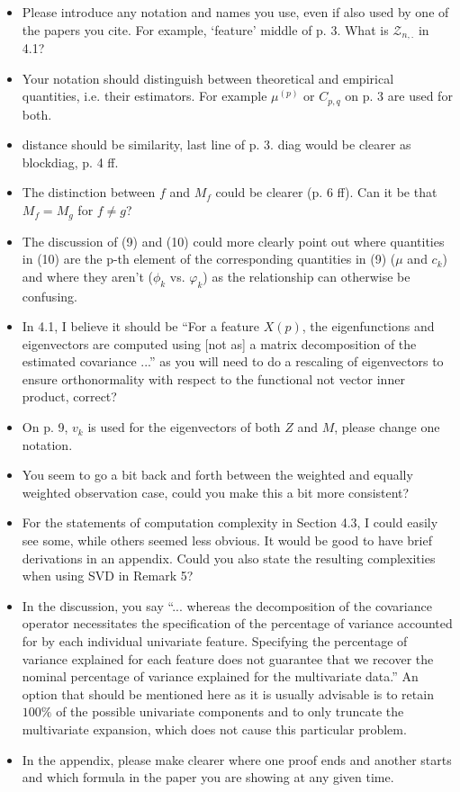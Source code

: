 \documentclass[11pt]{article}
\begin{document}
\begin{itemize}
  \item  Please introduce any notation and names you use, even if also used by one of the papers you cite. For example, ‘feature’ middle of p. 3. What is $\mathcal{Z}_{n,.}$ in 4.1?
  \item Your notation should distinguish between theoretical and empirical quantities, i.e. their estimators. For example $\mu^{(p)}$ or $C_{p,q}$ on p. 3 are used for both.
  \item distance should be similarity, last line of p. 3. diag would be clearer as blockdiag, p. 4 ff.
  \item The distinction between $f$ and $M_f$ could be clearer (p. 6 ff). Can it be that $M_f = M_g$ for $f \neq g$?
  \item The discussion of (9) and (10) could more clearly point out where quantities in (10) are the p-th element of the corresponding quantities in (9) ($\mu$ and $c_k$) and where they aren't ($\phi_k$ vs. $\varphi_k$) as the relationship can otherwise be confusing.
  \item In 4.1, I believe it should be “For a feature $X(p)$, the eigenfunctions and eigenvectors are computed using [not as] a matrix decomposition of the estimated covariance ...” as you will need to do a rescaling of eigenvectors to ensure orthonormality with respect to the functional not vector inner product, correct?
  \item On p. 9, $v_k$ is used for the eigenvectors of both $Z$ and $M$, please change one notation.
  \item You seem to go a bit back and forth between the weighted and equally weighted observation case, could you make this a bit more consistent?
  \item For the statements of computation complexity in Section 4.3, I could easily see some, while others seemed less obvious. It would be good to have brief derivations in an appendix. Could you also state the resulting complexities when using SVD in Remark 5?
  \item In the discussion, you say “... whereas the decomposition of the covariance operator necessitates the specification of the percentage of variance accounted for by each individual univariate feature. Specifying the percentage of variance explained for each feature does not guarantee that we recover the nominal percentage of variance explained for the multivariate data.” An option that should be mentioned here as it is usually advisable is to retain $100\%$ of the possible univariate components and to only truncate the multivariate expansion, which does not cause this particular problem.
  \item In the appendix, please make clearer where one proof ends and another starts and which formula in the paper you are showing at any given time.
\end{itemize}
\end{document}
